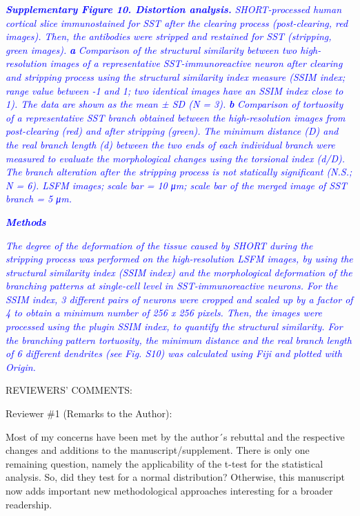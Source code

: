 \documentclass{article}
\newcommand{\reply}[1]{\textcolor{blue}{#1}}
\begin{document}
\noindent \reply{\emph{\textbf{Supplementary Figure 10. Distortion analysis.}}} \reply{\emph{SHORT-processed human cortical slice}} \reply{\emph{immunostained for SST after the clearing process (post-clearing, red images). Then, the antibodies}} \reply{\emph{were stripped and restained for SST (stripping, green images).}} \reply{\emph{\textbf{a}}} \reply{\emph{Comparison of the structural}} \reply{\emph{similarity between two high-resolution images of a representative SST-immunoreactive neuron}} \reply{\emph{after clearing and stripping process using the structural similarity index measure (SSIM index;}} \reply{\emph{range value between -1 and 1; two identical images have an SSIM index close to 1). The data are}} \reply{\emph{shown as the mean ± SD (N = 3).}} \reply{\emph{\textbf{b}}} \reply{\emph{Comparison of tortuosity of a representative SST branch}} \reply{\emph{obtained between the high-resolution images from post-clearing (red) and after stripping (green).}} \reply{\emph{The minimum distance (D) and the real branch length (d) between the two ends of each individual}} \reply{\emph{branch were measured to evaluate the morphological changes using the torsional index (d/D). The}} \reply{\emph{branch alteration after the stripping process is not statically significant (N.S.; N = 6). LSFM images;}} \reply{\emph{scale bar = 10 μm; scale bar of the merged image of SST branch = 5 μm.}}

\noindent \reply{\emph{\textbf{Methods}}}

\noindent \reply{\emph{The degree of the deformation of the tissue caused by SHORT during the stripping process was}} \reply{\emph{performed on the high-resolution LSFM images, by using the structural similarity index (SSIM}} \reply{\emph{index) and the morphological deformation of the branching patterns at single-cell level in SST-}}\reply{\emph{immunoreactive neurons. For the SSIM index, 3 different pairs of neurons were cropped and}} \reply{\emph{scaled up by a factor of 4 to obtain a minimum number of 256 x 256 pixels. Then, the images were}} \reply{\emph{processed using the plugin SSIM index, to quantify the structural similarity. For the branching}} \reply{\emph{pattern tortuosity, the minimum distance and the real branch length of 6 different dendrites (see}} \reply{\emph{Fig. S10) was calculated using Fiji and plotted with Origin.}}

\noindent {}REVIEWERS' COMMENTS:

\noindent Reviewer \#1 (Remarks to the Author):

\noindent Most of my concerns have been met by the author´s rebuttal and the respective changes and additions to the manuscript/supplement. There is only one remaining question, namely the applicability of the t-test for the statistical analysis. So, did they test for a normal distribution? Otherwise, this manuscript now adds important new methodological approaches interesting for a broader readership.
\end{document}

